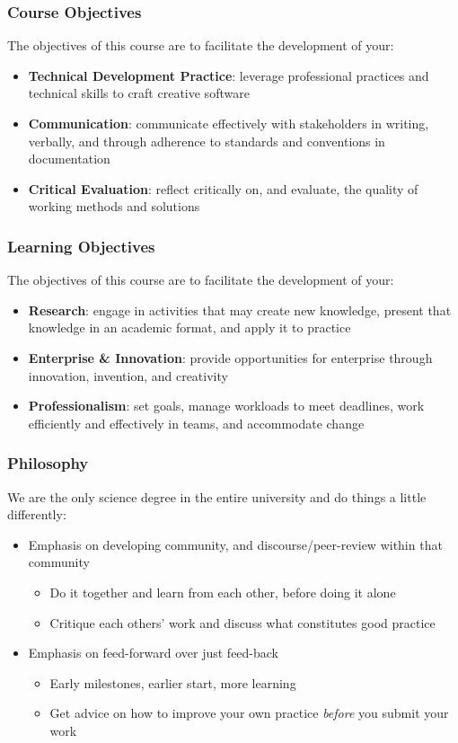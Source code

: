 \begin{frame}
	\frametitle{Course Objectives}
	
	The objectives of this course are to facilitate the development of your: \pause
	
	\begin{itemize}
		\item \textbf{Technical Development Practice}: leverage professional practices and technical skills to craft creative software \pause
		\item \textbf{Communication}: communicate effectively with stakeholders in writing, verbally, and through adherence to standards and conventions in documentation \pause
		\item \textbf{Critical Evaluation}: reflect critically on, and evaluate, the quality of working methods and solutions
	\end{itemize}
\end{frame}

\begin{frame}
	\frametitle{Learning Objectives}
	
	The objectives of this course are to facilitate the development of your:
	
	\begin{itemize}
		\item \textbf{Research}: engage in activities that may create new knowledge, present that knowledge in an academic format, and apply it to practice\pause
		\item \textbf{Enterprise \& Innovation}: provide opportunities for enterprise through innovation, invention, and creativity\pause
		\item \textbf{Professionalism}: set goals, manage workloads to meet deadlines, work efficiently and effectively in teams, and accommodate change
	\end{itemize}
\end{frame}

\begin{frame}
	\frametitle{Philosophy}
	
	We are the only science degree in the entire university and do things a little differently:
	
	\begin{itemize}
		\pause\item Emphasis on developing community, and discourse/peer-review within that community
		\begin{itemize}
			\item Do it together and learn from each other, before doing it alone
			\item Critique each others' work and discuss what constitutes good practice
		\end{itemize}
		\pause\item Emphasis on feed-forward over just feed-back
		\begin{itemize}
			\item Early milestones, earlier start, more learning
			\item Get advice on how to improve your own practice \textit{before} you submit your work
		\end{itemize}
	\end{itemize}
\end{frame}

